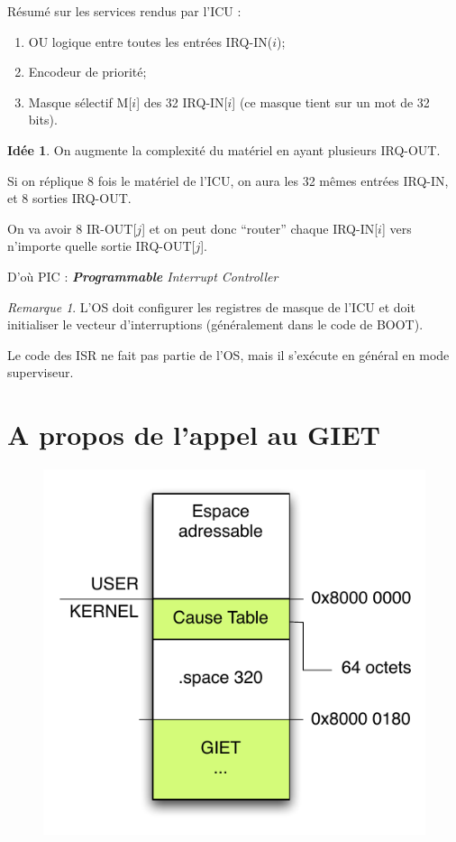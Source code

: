 \documentclass[11pt,english,french]{scrreprt}
\theoremstyle{remark}
\newtheorem*{rem*}{Remarque}
\theoremstyle{definition}
\newtheorem*{idee*}{Idée}
\begin{document}
Résumé sur les services rendus par l'ICU :\begin{enumerate}
	\item OU logique entre toutes les entrées IRQ-IN($i$);
	\item Encodeur de priorité;
	\item Masque sélectif M[$i$] des 32 IRQ-IN[$i$] (ce masque tient sur un mot de 32 bits).
\end{enumerate}

\begin{idee*}
	On augmente la complexité du matériel en ayant plusieurs IRQ-OUT.
	
	Si on réplique 8 fois le matériel de l'ICU, on aura les 32 mêmes entrées IRQ-IN, et 8 sorties IRQ-OUT.
	
	On va avoir 8 IR-OUT[$j$] et on peut donc ``router'' chaque IRQ-IN[$i$] vers n'importe quelle sortie IRQ-OUT[$j$].
	
	D'où PIC : \emph{\textbf{Programmable} Interrupt Controller}
\end{idee*}

\begin{rem*}
	L'OS doit configurer les registres de masque de l'ICU et doit initialiser le vecteur d'interruptions (généralement dans le code de BOOT).
	
	Le code des ISR ne fait pas partie de l'OS, mais il s'exécute en général en mode superviseur.
\end{rem*}

\section{A propos de l'appel au GIET} %

\begin{figure}
	\vspace{-30pt}
	\center
	\includegraphics[scale=.5]{diagrammes/cause-table}
	\vspace{-10pt}
\end{figure}
\end{document}
